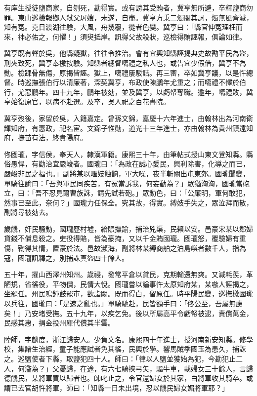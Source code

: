 \begin{pinyinscope}
有庠生授徒鹽商家，自刎死，勘得實。或有謗其受賄者，冀亨無所避，卒釋鹽商勿罪。東山巡檢報鄉人弒父屠嫂，未遂，自盡。冀亨方秉二燭閱其詞，燭無風齊滅，知有冤。克日渡湖往驗，大風，舟幾覆，從者色變。冀亨曰：「縣官伸冤理枉而來，神必佑之，何懼！」須臾抵岸。訊得父故殺狀，巡檢得賄誣報，俱論如律。

冀亨既有聲於吳，他縣疑獄，往往令推治。會有宜興知縣誣揭典史故勘平民為盜，刑夾致死，冀亨奉檄按驗。知縣者總督噶禮之私人也，或告宜少假借，冀亨不為動。檢踝骨無傷，原揭皆誣。獄上，噶禮屢駁詰。再三審，卒如冀亨議，以是忤總督。時巡撫張伯行以清廉著，深契冀亨，布政使陳鵬年尤重之；而噶禮不懌於伯行，尤惡鵬年。四十九年，鵬年被劾，並及冀亨，以虧帑奪職。逾年，噶禮敗，冀亨始復原官，以病不赴選。及卒，吳人祀之百花書院。

冀亨歿後，家留於吳，入籍嘉定。曾孫文錦，嘉慶十六年進士，由翰林出為河南衛輝知府，有惠政，祀名宦。文錦子惟勛，道光十三年進士，亦由翰林為貴州鎮遠知府，撫苗有法，終貴陽府。

佟國瓏，字信侯，奉天人，隸漢軍籍。康熙三十年，由筆帖式授山東文登知縣。縣俗愚悍，有勸治宜嚴峻者。國瓏曰：「為政在誠心愛民，興利除害，化導之而已，嚴峻非民之福也。」副將某以暱妓蝕餉，軍大噪，夜半斬關出屯東郊。國瓏聞變，單騎往諭曰：「吾與軍民同疾苦，有冤當訴我，何妄動為？」眾猶洶洶，國瓏當砲立，曰：「吾不忍見爾曹族誅，請先試若砲。」眾動色，曰：「公廉明，軍何敢犯，然事已至此，奈何？」國瓏力任保全。究其故，得實。縛妓手失之，眾泣拜而散，副將尋被劾去。

歲饑，奸民騷動，國瓏歷村墟，給賑撫諭，捕治兇渠，民賴以安。邑豪宋某以鄰婦貸錢不償息殺之。吏役得賂，皆為豪掩，又以千金賄國瓏。國瓏怒，覆驗婦有重傷，鞫得其情，置豪於法。邑故瀕海，副將林某縛商舶之泊島嶼者數千人，指為寇，國瓏訊釋之，別捕誅真盜四十餘人。

五十年，擢山西澤州知州。歲祲，發常平倉以貸民，克期輸還無爽。又減耗羨，革陋規，省徭役，平物價，民情大悅。國瓏嘗以論事忤太原知府某，某嗾人誣揭之，坐罷任。州民鳴鐘鼓罷市，欲詣闕。既而得白，留原任。時平陽民變，巡撫檄國瓏以兵往，國瓏曰：「是速之亂也。」單騎馳赴，民皆額手曰：「佟公至，吾屬無慮矣！」乃安堵受撫。五十九年，以疾乞免。後以所屬高平令虧帑被逮，責償萬金，民感其惠，捐金投州庫代償其半雲。

陸師，字麟度，浙江歸安人。少負文名。康熙四十年進士，授河南新安知縣。修學校，集諸生治經，童子能應試者免其徭，民興於學。響馬賊季國玉為患久，捕誅之。巡鹽使者下縣，取鹽犯四十人。師曰：「律以人鹽並獲始為犯，今勘犯止二人，何濫為？」父憂歸，在途，有六七騎挾弓矢，驅牛車，載婦女三十餘人，言歸德饑民，某將軍買以歸者也。師叱止之，令官還婦女於其家，白將軍收其騎卒。或謂已去官胡忤將軍，師曰：「知縣一日未出境，忍以饑民婦女媚將軍耶？」


\end{pinyinscope}
